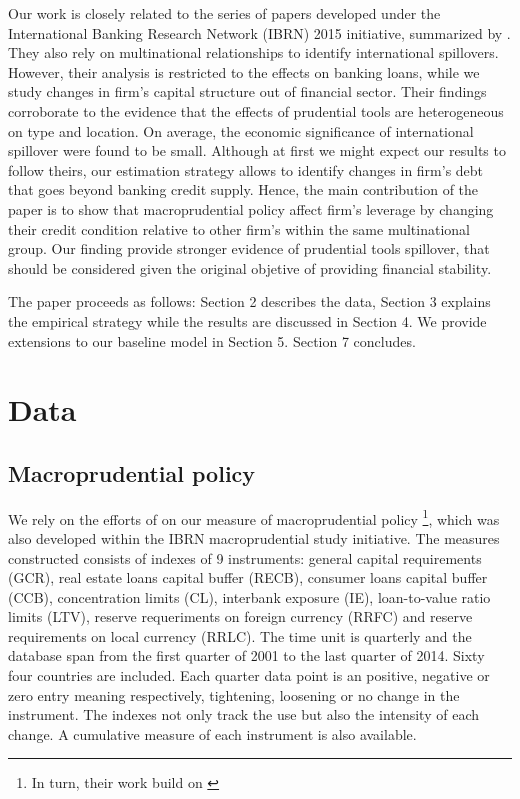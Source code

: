 \documentclass[12pt]{article}
\begin{document}
	Our work is closely related to the series of papers developed under the International Banking Research Network (IBRN) 2015 initiative, summarized by \cite{buch2017international}. They also rely on multinational relationships to identify international spillovers. However, their analysis is restricted to the effects on banking loans, while we study changes in firm's capital structure out of financial sector. Their findings corroborate to the evidence that the effects of prudential tools are heterogeneous on type and location. On average, the economic significance of international spillover were found to be small. Although at first we might expect our results to follow theirs, our estimation strategy allows to identify changes in firm's debt that goes beyond banking credit supply. Hence, the main contribution of the paper is to show that macroprudential policy affect firm's leverage by changing their credit condition relative to other firm's within the same multinational group. Our finding provide stronger evidence of prudential tools spillover, that should be considered given the original objetive of providing financial stability.
	
	The paper proceeds as follows: Section 2 describes the data, Section 3 explains the empirical strategy while the results are discussed in Section 4. We provide extensions to our baseline model in Section 5. Section 7 concludes. 
	
	\section{Data} \label{sec:data}
	\subsection{Macroprudential policy} \label{subsec:MPI}
	
	We rely on the efforts of \cite*{cerutti2016changes} on our measure of macroprudential policy \footnote{ In turn, their work build on \cite*{cerutti2015use}}, which was also developed within the IBRN macroprudential study initiative. The measures constructed consists of indexes of 9 instruments: general capital requirements (GCR), real estate loans capital buffer (RECB), consumer loans capital buffer (CCB), concentration limits (CL), interbank exposure (IE), loan-to-value ratio limits (LTV), reserve requeriments on foreign currency (RRFC) and reserve requirements on local currency (RRLC). The time unit is quarterly and the database span from the first quarter of 2001 to the last quarter of 2014. Sixty four countries are included. Each quarter data point is an positive, negative or zero entry meaning respectively, tightening, loosening or no change in the instrument. The indexes not only track the use but also the intensity of each change. A cumulative measure of each instrument is also available.    
	
\end{document}
